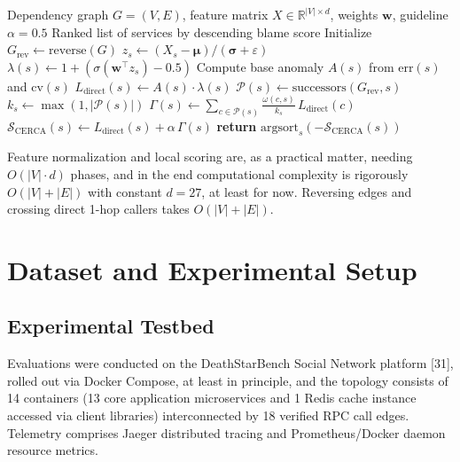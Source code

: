 \documentclass[conference]{IEEEtran}
\begin{document}
\begin{algorithm}[!t]
\caption{CERCA Root Cause Inference}
\label{alg:cerca}
\begin{algorithmic}[1]
\REQUIRE Dependency graph $G = (V, E)$, feature matrix $X \in \mathbb{R}^{|V| \times d}$, weights $\mathbf{w}$, guideline $\alpha = 0.5$
\ENSURE Ranked list of services by descending blame score
\STATE Initialize $G_{\mathrm{rev}} \leftarrow \mathrm{reverse}(G)$
    \STATE $z_s \leftarrow (X_s - \boldsymbol{\mu})/(\boldsymbol{\sigma} + \varepsilon)$
    \STATE $\lambda(s) \leftarrow 1 + (\sigma(\mathbf{w}^{\top}z_s) - 0.5)$
    \STATE Compute base anomaly $A(s)$ from $\mathrm{err}(s)$ and $\mathrm{cv}(s)$
    \STATE $L_{\mathrm{direct}}(s) \leftarrow A(s) \cdot \lambda(s)$
\ENDFOR
{}
    \STATE $\mathcal{P}(s) \leftarrow \mathrm{successors}(G_{\mathrm{rev}}, s)$ 
    \STATE $k_s \leftarrow \max(1, |\mathcal{P}(s)|)$
    \STATE $\Gamma(s) \leftarrow \sum_{c \in \mathcal{P}(s)} \frac{\omega(c, s)}{k_s}\,L_{\mathrm{direct}}(c)$
    \STATE $\mathcal{S}_{\mathrm{CERCA}}(s) \leftarrow L_{\mathrm{direct}}(s) + \alpha\,\Gamma(s)$
\ENDFOR
\STATE \textbf{return} $\mathrm{argsort}_s(-\mathcal{S}_{\mathrm{CERCA}}(s))$
\end{algorithmic}
\end{algorithm}

Feature normalization and local scoring are, as a practical matter, needing $O(|V| \cdot d)$ phases, and in the end computational complexity is rigorously $O(|V| + |E|)$ with constant $d = 27$, at least for now. Reversing edges and crossing direct 1-hop callers takes $O(|V| + |E|)$.

\section{Dataset and Experimental Setup}

\subsection{Experimental Testbed}
Evaluations were conducted on the DeathStarBench Social Network platform [31], rolled out via Docker Compose, at least in principle, and the topology consists of 14 containers (13 core application microservices and 1 Redis cache instance accessed via client libraries) interconnected by 18 verified RPC call edges. Telemetry comprises Jaeger distributed tracing and Prometheus/Docker daemon resource metrics.
\end{document}
